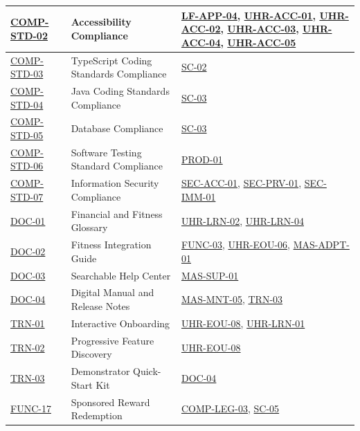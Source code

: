 \documentclass[12pt]{article}
\begin{document}
\begin{xltabular}{\textwidth}{|p{2.3cm}|p{4.2cm}|X|}
\hline
\hyperlink{req:COMP-STD-02}{COMP-STD-02} & Accessibility Compliance & \hyperlink{req:LF-APP-04}{LF-APP-04}, \hyperlink{req:UHR-ACC-01}{UHR-ACC-01}, \hyperlink{req:UHR-ACC-02}{UHR-ACC-02}, \hyperlink{req:UHR-ACC-03}{UHR-ACC-03}, \hyperlink{req:UHR-ACC-04}{UHR-ACC-04}, \hyperlink{req:UHR-ACC-05}{UHR-ACC-05} \\
\hline
\hyperlink{req:COMP-STD-03}{COMP-STD-03} & TypeScript Coding Standards Compliance & \hyperlink{req:SC-02}{SC-02} \\
\hline
\hyperlink{req:COMP-STD-04}{COMP-STD-04} & Java Coding Standards Compliance & \hyperlink{req:SC-03}{SC-03} \\
\hline
\hyperlink{req:COMP-STD-05}{COMP-STD-05} & Database Compliance & \hyperlink{req:SC-03}{SC-03} \\
\hline
\hyperlink{req:COMP-STD-06}{COMP-STD-06} & Software Testing Standard Compliance & \hyperlink{req:PROD-01}{PROD-01} \\
\hline
\hyperlink{req:COMP-STD-07}{COMP-STD-07} & Information Security Compliance & \hyperlink{req:SEC-ACC-01}{SEC-ACC-01}, \hyperlink{req:SEC-PRV-01}{SEC-PRV-01}, \hyperlink{req:SEC-IMM-01}{SEC-IMM-01} \\
\hline
\hyperlink{req:DOC-01}{DOC-01} & Financial and Fitness Glossary & \hyperlink{req:UHR-LRN-02}{UHR-LRN-02}, \hyperlink{req:UHR-LRN-04}{UHR-LRN-04} \\
\hline
\hyperlink{req:DOC-02}{DOC-02} & Fitness Integration Guide & \hyperlink{req:FUNC-03}{FUNC-03}, \hyperlink{req:UHR-EOU-06}{UHR-EOU-06}, \hyperlink{req:MAS-ADPT-01}{MAS-ADPT-01} \\
\hline
\hyperlink{req:DOC-03}{DOC-03} & Searchable Help Center & \hyperlink{req:MAS-SUP-01}{MAS-SUP-01} \\
\hline
\hyperlink{req:DOC-04}{DOC-04} & Digital Manual and Release Notes & \hyperlink{req:MAS-MNT-05}{MAS-MNT-05}, \hyperlink{req:TRN-03}{TRN-03} \\
\hline
\hyperlink{req:TRN-01}{TRN-01} & Interactive Onboarding & \hyperlink{req:UHR-EOU-08}{UHR-EOU-08}, \hyperlink{req:UHR-LRN-01}{UHR-LRN-01} \\
\hline
\hyperlink{req:TRN-02}{TRN-02} & Progressive Feature Discovery & \hyperlink{req:UHR-EOU-08}{UHR-EOU-08} \\
\hline
\hyperlink{req:TRN-03}{TRN-03} & Demonstrator Quick-Start Kit & \hyperlink{req:DOC-04}{DOC-04} \\
\hline
\hyperlink{req:FUNC-17}{FUNC-17} & Sponsored Reward Redemption & \hyperlink{req:COMP-LEG-03}{COMP-LEG-03}, \hyperlink{req:SC-05}{SC-05} \\

\end{xltabular}
\end{document}

